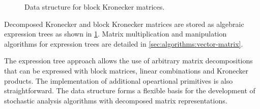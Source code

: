 \begin{figure}
  \centering
  \caption{Data structure for block Kronecker matrices.}
  \label{fig:genstor:kronecker:datastructure}
\end{figure}

Decomposed Kronecker and block Kronecker matrices are stored as
algebraic expression trees as shown in
\cref{fig:genstor:kronecker:datastructure}. Matrix multiplication
and manipulation algorithms for expression trees are detailed in
\vref{sec:algorithms:vector-matrix}.

The expression tree approach allows the use of arbitrary matrix
decompositions that can be expressed with block matrices, linear
combinations and Kronecker products. The implementation of additional
opeartional primitives is also straightforward. The data structure
forms a flexible basis for the development of stochastic analysis
algorithms with decomposed matrix representations.